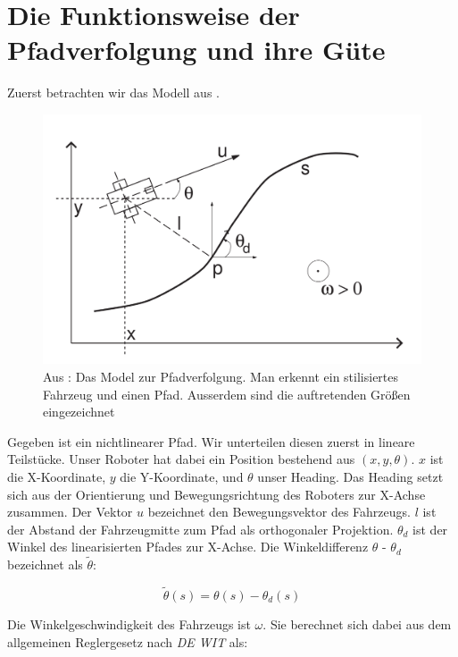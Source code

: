 \documentclass[11pt,a4paper]{article}
\begin{document}
\section{Die Funktionsweise der Pfadverfolgung und ihre Güte}

Zuerst betrachten wir das Modell aus \cite{INDIVERI2004185}.

\begin{figure}[ht]
  \centering
  \includegraphics[scale = 0.3]{model.png}
  \caption{Aus \cite{INDIVERI2004185}: Das Model zur Pfadverfolgung. Man erkennt ein stilisiertes Fahrzeug und einen Pfad. Ausserdem sind die auftretenden Größen eingezeichnet}
  \label{fig: ModelPfadverfolgung}
  \end{figure}

Gegeben ist ein nichtlinearer Pfad. Wir unterteilen diesen zuerst in lineare Teilstücke. Unser Roboter hat dabei 
ein Position bestehend aus $(x,y,\theta)$. $x$ ist die X-Koordinate, $y$ die Y-Koordinate, und $\theta$ unser Heading.
Das Heading setzt sich aus der Orientierung und Bewegungsrichtung des Roboters zur X-Achse zusammen. Der Vektor $u$ bezeichnet den Bewegungsvektor des Fahrzeugs.
$l$ ist der Abstand der Fahrzeugmitte zum Pfad als orthogonaler Projektion. $\theta_d$ ist der Winkel des linearisierten Pfades zur X-Achse. Die Winkeldifferenz $\theta$ - $\theta_d$ bezeichnet 
\cite{INDIVERI2004185} als $\tilde{\theta}$: 

\begin{equation}
  \tilde{\theta}(s) = \theta(s) - \theta_d(s)
\end{equation}

Die Winkelgeschwindigkeit des Fahrzeugs ist $\omega$. Sie berechnet sich dabei aus dem allgemeinen Reglergesetz nach \textit{DE WIT} als:
\end{document}
